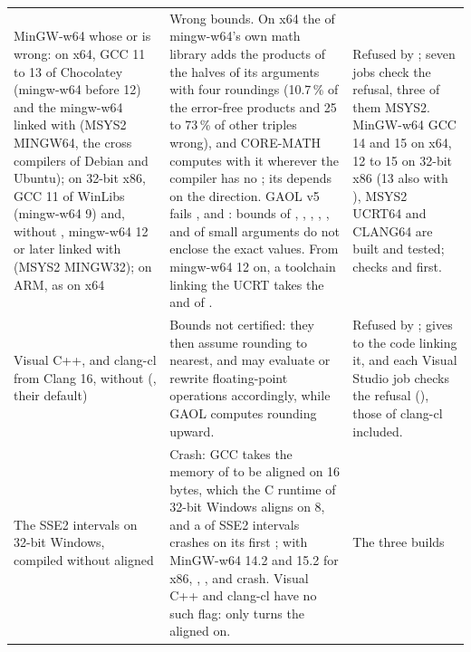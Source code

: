\documentclass[12pt,a4paper,twoside,openright]{book}
\begin{document}
\begin{longtable}{L{2.9cm}L{5.8cm}L{5cm}}
  MinGW-w64 whose  or  is wrong: on x64, GCC 11 to
    13 of Chocolatey (mingw-w64 before 12) and the mingw-w64 linked with
     (MSYS2 MINGW64, the cross compilers of Debian and
    Ubuntu); on 32-bit x86, GCC 11 of WinLibs (mingw-w64 9) and, without
    , mingw-w64 12 or later linked with 
    (MSYS2 MINGW32); on ARM, as on x64 & Wrong bounds. On x64 the
     of mingw-w64's own math library adds the products of the
    halves of its arguments with four roundings (10.7\,\% of the error-free
    products and 25 to 73\,\% of other triples wrong), and CORE-MATH
    computes with it wherever the compiler has no ; its
     depends on the direction. GAOL v5 fails
    ,  and : bounds of
    , , , , ,
     and  of small arguments do not enclose the
    exact values. From mingw-w64 12 on, a toolchain linking the UCRT takes
    the  and  of . & Refused by
    ; seven jobs check the refusal, three of them
    MSYS2. MinGW-w64 GCC 14 and 15 on x64, 12 to 15 on 32-bit x86 (13 also
    with ), MSYS2 UCRT64 and CLANG64 are built and
    tested;  checks  and 
    first.\\
  Visual C++, and clang-cl from Clang 16, without 
    (, their default) & Bounds not certified: they then
    assume rounding to nearest, and may evaluate or rewrite floating-point
    operations accordingly, while GAOL computes rounding upward. & Refused
    by ;  gives
     to the code linking it, and each Visual Studio job
    checks the refusal (), those of clang-cl
    included.\\
  The SSE2 intervals on 32-bit Windows, compiled without aligned 
    & Crash: GCC takes the memory of  to be aligned on 16 bytes,
    which the C runtime of 32-bit Windows aligns on 8, and a
     of SSE2 intervals crashes on its first
    ; with MinGW-w64 14.2 and 15.2 for x86, ,
    ,  and 
    crash. Visual C++ and clang-cl have no such flag: only
     turns the aligned  on. & The three builds

\end{longtable}
\end{document}
